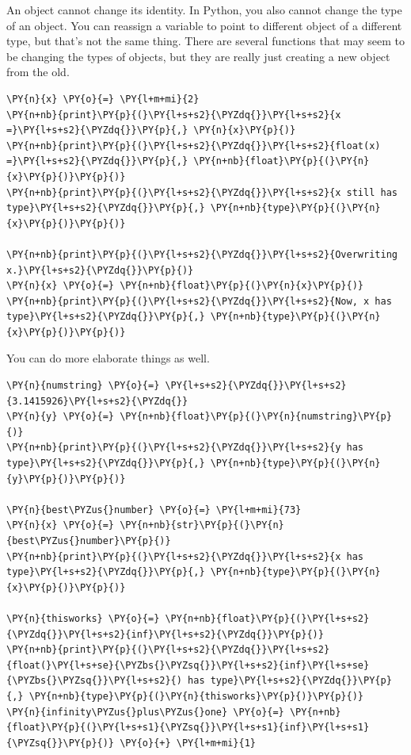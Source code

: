 An object cannot change its identity.
In Python, you also cannot change the type of an object.
You can reassign a variable to point to different object of a different type, but that's not the same thing.
There are several functions that may seem to be changing the types of objects, but they are really just creating a new object from the old.

\begin{Verbatim}[commandchars=\\\{\}]
\PY{n}{x} \PY{o}{=} \PY{l+m+mi}{2}
\PY{n+nb}{print}\PY{p}{(}\PY{l+s+s2}{\PYZdq{}}\PY{l+s+s2}{x =}\PY{l+s+s2}{\PYZdq{}}\PY{p}{,} \PY{n}{x}\PY{p}{)}
\PY{n+nb}{print}\PY{p}{(}\PY{l+s+s2}{\PYZdq{}}\PY{l+s+s2}{float(x) =}\PY{l+s+s2}{\PYZdq{}}\PY{p}{,} \PY{n+nb}{float}\PY{p}{(}\PY{n}{x}\PY{p}{)}\PY{p}{)}
\PY{n+nb}{print}\PY{p}{(}\PY{l+s+s2}{\PYZdq{}}\PY{l+s+s2}{x still has type}\PY{l+s+s2}{\PYZdq{}}\PY{p}{,} \PY{n+nb}{type}\PY{p}{(}\PY{n}{x}\PY{p}{)}\PY{p}{)}

\PY{n+nb}{print}\PY{p}{(}\PY{l+s+s2}{\PYZdq{}}\PY{l+s+s2}{Overwriting x.}\PY{l+s+s2}{\PYZdq{}}\PY{p}{)}
\PY{n}{x} \PY{o}{=} \PY{n+nb}{float}\PY{p}{(}\PY{n}{x}\PY{p}{)}
\PY{n+nb}{print}\PY{p}{(}\PY{l+s+s2}{\PYZdq{}}\PY{l+s+s2}{Now, x has type}\PY{l+s+s2}{\PYZdq{}}\PY{p}{,} \PY{n+nb}{type}\PY{p}{(}\PY{n}{x}\PY{p}{)}\PY{p}{)}
\end{Verbatim}



You can do more elaborate things as well.

\begin{Verbatim}[commandchars=\\\{\}]
\PY{n}{numstring} \PY{o}{=} \PY{l+s+s2}{\PYZdq{}}\PY{l+s+s2}{3.1415926}\PY{l+s+s2}{\PYZdq{}}
\PY{n}{y} \PY{o}{=} \PY{n+nb}{float}\PY{p}{(}\PY{n}{numstring}\PY{p}{)}
\PY{n+nb}{print}\PY{p}{(}\PY{l+s+s2}{\PYZdq{}}\PY{l+s+s2}{y has type}\PY{l+s+s2}{\PYZdq{}}\PY{p}{,} \PY{n+nb}{type}\PY{p}{(}\PY{n}{y}\PY{p}{)}\PY{p}{)}

\PY{n}{best\PYZus{}number} \PY{o}{=} \PY{l+m+mi}{73}
\PY{n}{x} \PY{o}{=} \PY{n+nb}{str}\PY{p}{(}\PY{n}{best\PYZus{}number}\PY{p}{)}
\PY{n+nb}{print}\PY{p}{(}\PY{l+s+s2}{\PYZdq{}}\PY{l+s+s2}{x has type}\PY{l+s+s2}{\PYZdq{}}\PY{p}{,} \PY{n+nb}{type}\PY{p}{(}\PY{n}{x}\PY{p}{)}\PY{p}{)}

\PY{n}{thisworks} \PY{o}{=} \PY{n+nb}{float}\PY{p}{(}\PY{l+s+s2}{\PYZdq{}}\PY{l+s+s2}{inf}\PY{l+s+s2}{\PYZdq{}}\PY{p}{)}
\PY{n+nb}{print}\PY{p}{(}\PY{l+s+s2}{\PYZdq{}}\PY{l+s+s2}{float(}\PY{l+s+se}{\PYZbs{}\PYZsq{}}\PY{l+s+s2}{inf}\PY{l+s+se}{\PYZbs{}\PYZsq{}}\PY{l+s+s2}{) has type}\PY{l+s+s2}{\PYZdq{}}\PY{p}{,} \PY{n+nb}{type}\PY{p}{(}\PY{n}{thisworks}\PY{p}{)}\PY{p}{)}
\PY{n}{infinity\PYZus{}plus\PYZus{}one} \PY{o}{=} \PY{n+nb}{float}\PY{p}{(}\PY{l+s+s1}{\PYZsq{}}\PY{l+s+s1}{inf}\PY{l+s+s1}{\PYZsq{}}\PY{p}{)} \PY{o}{+} \PY{l+m+mi}{1}
\end{Verbatim}



